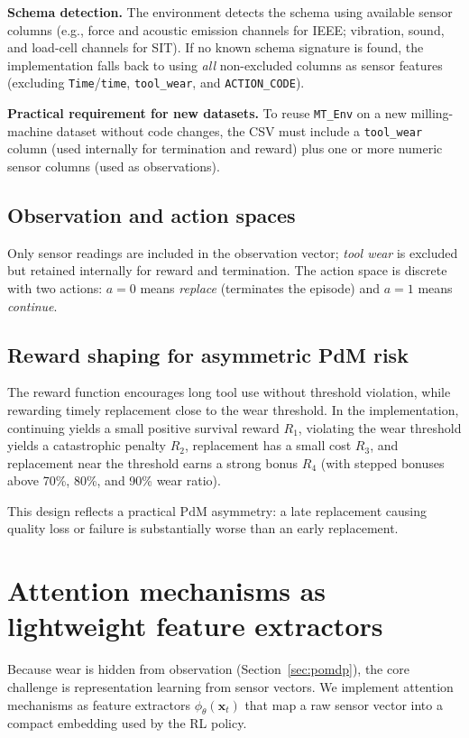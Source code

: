 \documentclass[refree,sn-basic]{sn-jnl} %
\begin{document}
\textbf{Schema detection.}
The environment detects the schema using available sensor columns (e.g., force and acoustic emission channels for IEEE; vibration, sound, and load-cell channels for SIT). If no known schema signature is found, the implementation falls back to using \emph{all} non-excluded columns as sensor features (excluding \texttt{Time}/\texttt{time}, \texttt{tool\_wear}, and \texttt{ACTION\_CODE}).

\textbf{Practical requirement for new datasets.}
To reuse \texttt{MT\_Env} on a new milling-machine dataset without code changes, the CSV must include a \texttt{tool\_wear} column (used internally for termination and reward) plus one or more numeric sensor columns (used as observations).

\subsection{Observation and action spaces}
Only sensor readings are included in the observation vector; \emph{tool wear} is excluded but retained internally for reward and termination. The action space is discrete with two actions: $a=0$ means \emph{replace} (terminates the episode) and $a=1$ means \emph{continue}.

\subsection{Reward shaping for asymmetric PdM risk}
\label{sec:reward}
The reward function encourages long tool use without threshold violation, while rewarding timely replacement close to the wear threshold. In the implementation, continuing yields a small positive survival reward $R_1$, violating the wear threshold yields a catastrophic penalty $R_2$, replacement has a small cost $R_3$, and replacement near the threshold earns a strong bonus $R_4$ (with stepped bonuses above 70\%, 80\%, and 90\% wear ratio).

This design reflects a practical PdM asymmetry: a late replacement causing quality loss or failure is substantially worse than an early replacement.

\section{Attention mechanisms as lightweight feature extractors}
\label{sec:attention}
Because wear is hidden from observation (Section~\ref{sec:pomdp}), the core challenge is representation learning from sensor vectors. We implement attention mechanisms as feature extractors $\phi_\theta(\mathbf{x}_t)$ that map a raw sensor vector into a compact embedding used by the RL policy.
\end{document}
